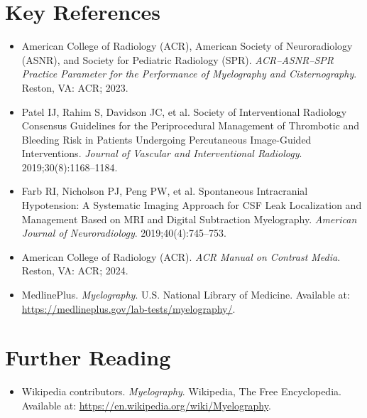 \section{Key References}
\begin{itemize}
    \item American College of Radiology (ACR), American Society of Neuroradiology (ASNR), and Society for Pediatric Radiology (SPR). \textit{ACR--ASNR--SPR Practice Parameter for the Performance of Myelography and Cisternography}. Reston, VA: ACR; 2023.
    \item Patel IJ, Rahim S, Davidson JC, et al. Society of Interventional Radiology Consensus Guidelines for the Periprocedural Management of Thrombotic and Bleeding Risk in Patients Undergoing Percutaneous Image-Guided Interventions. \textit{Journal of Vascular and Interventional Radiology}. 2019;30(8):1168--1184.
    \item Farb RI, Nicholson PJ, Peng PW, et al. Spontaneous Intracranial Hypotension: A Systematic Imaging Approach for CSF Leak Localization and Management Based on MRI and Digital Subtraction Myelography. \textit{American Journal of Neuroradiology}. 2019;40(4):745--753.
    \item American College of Radiology (ACR). \textit{ACR Manual on Contrast Media}. Reston, VA: ACR; 2024.
    \item MedlinePlus. \textit{Myelography}. U.S. National Library of Medicine. Available at: \url{https://medlineplus.gov/lab-tests/myelography/}.
\end{itemize}

\section{Further Reading}
\begin{itemize}
  \item Wikipedia contributors. \textit{Myelography}. Wikipedia, The Free Encyclopedia. Available at: \url{https://en.wikipedia.org/wiki/Myelography}.
\end{itemize}
